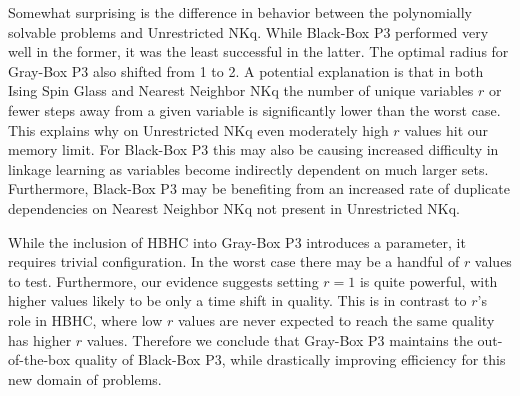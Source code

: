 Somewhat surprising is the difference in behavior between the polynomially solvable problems
and Unrestricted NKq. While Black-Box P3 performed very well in the former, it was the least
successful in the latter. The optimal radius for Gray-Box P3 also shifted from 1 to 2.
A potential explanation is that in both Ising Spin Glass
and Nearest Neighbor NKq the number of unique variables $r$
or fewer steps away from a given variable is significantly lower than the worst case. This explains why on Unrestricted NKq
even moderately high $r$ values hit our memory limit.
For Black-Box P3 this may also be causing increased difficulty in linkage learning as variables
become indirectly dependent on much larger sets. Furthermore, Black-Box
P3 may be benefiting from an increased rate of duplicate dependencies on Nearest Neighbor NKq
not present in Unrestricted NKq.

While the inclusion of HBHC into Gray-Box P3 introduces a parameter, it requires
trivial configuration. In the worst case there may be a handful of $r$ values to test.
Furthermore, our evidence suggests setting $r=1$ is quite powerful, with higher values
likely to be only a time shift in quality. This is in contrast to $r$'s role in HBHC,
where low $r$ values are never expected to reach the same quality has higher $r$ values.
Therefore we conclude that Gray-Box P3 maintains the out-of-the-box quality of Black-Box
P3, while drastically improving efficiency for this new domain of problems.
